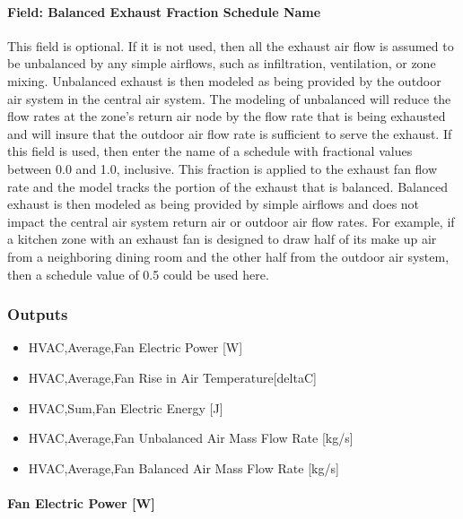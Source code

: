 \paragraph{Field: Balanced Exhaust Fraction Schedule Name}\label{field-balanced-exhaust-fraction-schedule-name}

This field is optional. If it is not used, then all the exhaust air flow is assumed to be unbalanced by any simple airflows, such as infiltration, ventilation, or zone mixing. Unbalanced exhaust is then modeled as being provided by the outdoor air system in the central air system. The modeling of unbalanced will reduce the flow rates at the zone's return air node by the flow rate that is being exhausted and will insure that the outdoor air flow rate is sufficient to serve the exhaust. If this field is used, then enter the name of a schedule with fractional values between 0.0 and 1.0, inclusive. This fraction is applied to the exhaust fan flow rate and the model tracks the portion of the exhaust that is balanced. Balanced exhaust is then modeled as being provided by simple airflows and does not impact the central air system return air or outdoor air flow rates. For example, if a kitchen zone with an exhaust fan is designed to draw half of its make up air from a neighboring dining room and the other half from the outdoor air system, then a schedule value of 0.5 could be used here.

\subsubsection{Outputs}\label{outputs-3-007}

\begin{itemize}
\item
  HVAC,Average,Fan Electric Power {[}W{]}
\item
  HVAC,Average,Fan Rise in Air Temperature{[}deltaC{]}
\item
  HVAC,Sum,Fan Electric Energy {[}J{]}
\item
  HVAC,Average,Fan Unbalanced Air Mass Flow Rate {[}kg/s{]}
\item
  HVAC,Average,Fan Balanced Air Mass Flow Rate {[}kg/s{]}
\end{itemize}

\paragraph{Fan Electric Power {[}W{]}}\label{fan-electric-power-w-3}

